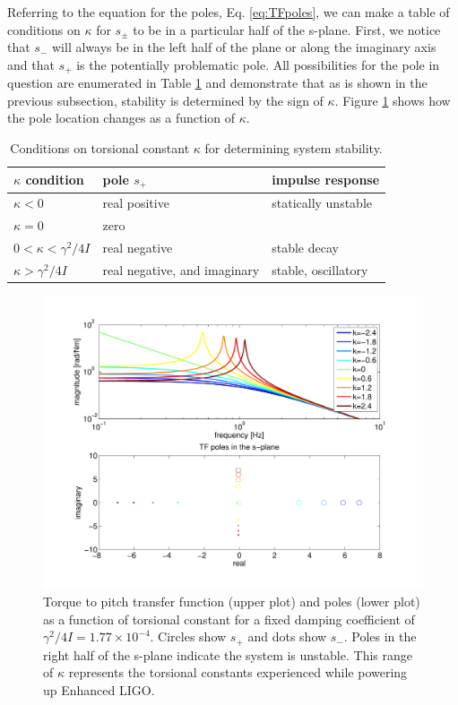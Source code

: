 Referring to the equation for the poles, Eq. \ref{eq:TFpoles}, we can
make a table of conditions on $\kappa$ for $s_\pm$ to be in a
particular half of the s-plane. First, we notice that $s_-$ will
always be in the left half of the plane or along the imaginary axis
and that $s_+$ is the potentially problematic pole. All possibilities
for the pole in question are enumerated in Table \ref{table:s_0} and
demonstrate that as is shown in the previous subsection, stability is
determined by the sign of $\kappa$. Figure \ref{fig:pendTF_k} shows
how the pole location changes as a function of $\kappa$.


\begin{table}
\centering
\caption{Conditions on torsional constant $\kappa$ for determining
 system stability.}
\begin{tabular}{l l l}
$\kappa$ condition & pole $s_+$ & impulse response \\
\hline\hline
$\kappa < 0$ & real positive & statically unstable\\
$\kappa = 0$ & zero & \\
$0 < \kappa < \gamma^2/4I $ & real negative & stable decay \\
$\kappa > \gamma^2/4I$ & real negative, and imaginary & stable,
oscillatory \\
\hline
\end{tabular}
\label{table:s_0}
\end{table}

\begin{figure}
\begin{centering}
\includegraphics[width=1.0\textwidth]{figures/pendTF_k.pdf}
\caption{Torque to pitch transfer function (upper plot) and poles
  (lower plot) as a function of torsional constant for a fixed damping
  coefficient of $\gamma^2/4I = 1.77 \times 10^{-4}$. Circles show
  $s_+$ and dots show $s_-$. Poles in the right half of the s-plane
  indicate the system is unstable. This range of $\kappa$ represents
  the torsional constants experienced while powering up Enhanced
  LIGO.}
\label{fig:pendTF_k}
\end{centering}
\end{figure}









